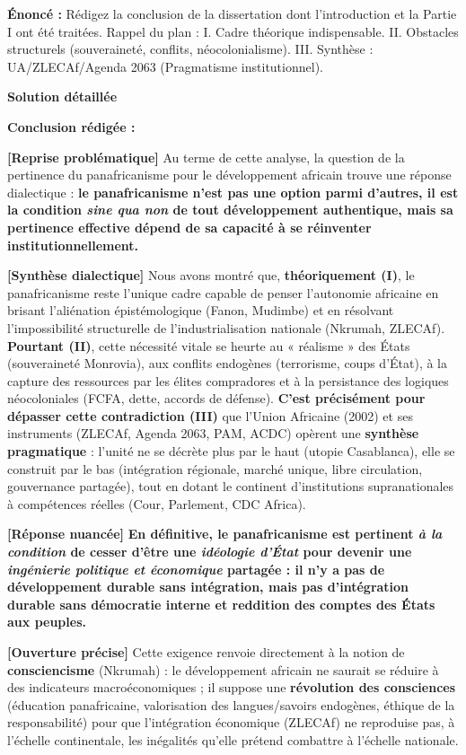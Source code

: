\documentclass[11pt]{article}
\begin{document}
\begin{exoresolu}
\textbf{Énoncé :} Rédigez la conclusion de la dissertation dont l'introduction et la Partie I ont été traitées. Rappel du plan : I. Cadre théorique indispensable. II. Obstacles structurels (souveraineté, conflits, néocolonialisme). III. Synthèse : UA/ZLECAf/Agenda 2063 (Pragmatisme institutionnel).

\tcblower
\textbf{Solution détaillée}

\textbf{Conclusion rédigée :}

\textbf{[Reprise problématique]} Au terme de cette analyse, la question de la pertinence du panafricanisme pour le développement africain trouve une réponse dialectique : \textbf{le panafricanisme n'est pas une option parmi d'autres, il est la condition \emph{sine qua non} de tout développement authentique, mais sa pertinence effective dépend de sa capacité à se réinventer institutionnellement.}

\textbf{[Synthèse dialectique]} Nous avons montré que, \textbf{théoriquement (I)}, le panafricanisme reste l'unique cadre capable de penser l'autonomie africaine en brisant l'aliénation épistémologique (Fanon, Mudimbe) et en résolvant l'impossibilité structurelle de l'industrialisation nationale (Nkrumah, ZLECAf). \textbf{Pourtant (II)}, cette nécessité vitale se heurte au « réalisme » des États (souveraineté Monrovia), aux conflits endogènes (terrorisme, coups d'État), à la capture des ressources par les élites compradores et à la persistance des logiques néocoloniales (FCFA, dette, accords de défense). \textbf{C'est précisément pour dépasser cette contradiction (III)} que l'Union Africaine (2002) et ses instruments (ZLECAf, Agenda 2063, PAM, ACDC) opèrent une \textbf{synthèse pragmatique} : l'unité ne se décrète plus par le haut (utopie Casablanca), elle se construit par le bas (intégration régionale, marché unique, libre circulation, gouvernance partagée), tout en dotant le continent d'institutions supranationales à compétences réelles (Cour, Parlement, CDC Africa).

\textbf{[Réponse nuancée]} \textbf{En définitive, le panafricanisme est pertinent \emph{à la condition} de cesser d'être une \emph{idéologie d'État} pour devenir une \emph{ingénierie politique et économique} partagée : il n'y a pas de développement durable sans intégration, mais pas d'intégration durable sans \textbf{démocratie interne} et \textbf{reddition des comptes} des États aux peuples.}

\textbf{[Ouverture précise]} Cette exigence renvoie directement à la notion de \textbf{consciencisme} (Nkrumah) : le développement africain ne saurait se réduire à des indicateurs macroéconomiques ; il suppose une \textbf{révolution des consciences} (éducation panafricaine, valorisation des langues/savoirs endogènes, éthique de la responsabilité) pour que l'intégration économique (ZLECAf) ne reproduise pas, à l'échelle continentale, les inégalités qu'elle prétend combattre à l'échelle nationale.
\end{exoresolu}
\end{document}

